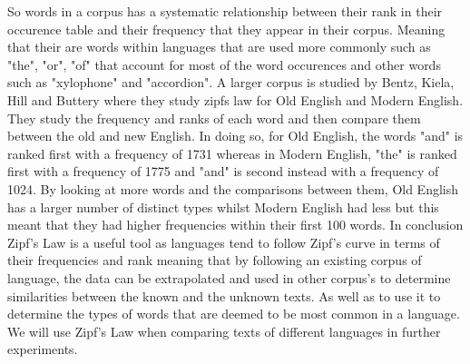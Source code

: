 So words in a corpus has a systematic relationship between their rank in their occurence table and their frequency that they appear in their corpus. Meaning that their are words within languages that are used more commonly such as "the", "or", "of" that account for most of the word occurences and other words such as "xylophone" and "accordion". A larger corpus is studied by Bentz, Kiela, Hill and Buttery \cite{BentzKielaHillButtery} where they study zipfs law for Old English and Modern English. They study the frequency and ranks of each word and then compare them between the old and new English. In doing so, for Old English, the words "and" is ranked first with a frequency of 1731 whereas in Modern English, "the" is ranked first with a frequency of 1775 and "and" is second instead with a frequency of 1024. By looking at more words and the comparisons between them, Old English has a larger number of distinct types whilst Modern English had less but this meant that they had higher frequencies within their first 100 words.
In conclusion Zipf's Law is a useful tool as languages tend to follow Zipf's curve in terms of their frequencies and rank meaning that by following an existing corpus of language, the data can be extrapolated and used in other corpus's to determine similarities between the known and the unknown texts. As well as to use it to determine the types of words that are deemed to be most common in a language. We will use Zipf's Law when comparing texts of different languages in further experiments. 


